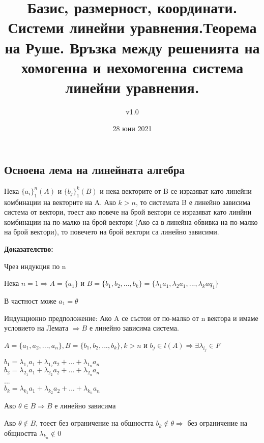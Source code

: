 \documentclass[fleqn,12pt]{article}
\title{Базис, размерност, координати.  Системи линейни уравнения.Теорема на Руше. Връзка между решенията на хомогенна и нехомогенна система линейни уравнения.}
\author{v1.0}
\date{28 юни 2021}
\begin{document}
\maketitle

\tableofcontents

\begin{flushleft}

\section{Осноена лема на линейната алгебра}
Нека $ \{ a_i \}_1^n (A) $ и $ \{ b_j \}_1^k (B) $ и нека векторите от B се изразяват като линейни комбинации на векторите на A. Ако $ k > n $, то системата B е линейно зависима система от вектори, тоест ако повече на брой вектори се изразяват като линйни комбинации на по-малко на брой вектори (Ако са в линейна обвивка на по-малко на брой вектори), то повечето на брой вектори са линейно зависими.

\vspace{5mm}

\textbf{Доказателство:}

Чрез индукция по n

\vspace{5mm}

Нека $ n = 1 \Rightarrow A = \{a_1\} $ и $ B = \{b_1, b_2, ..., b_k \} = \{\lambda_1 a_1, \lambda_2 a_1, ..., \lambda_k aq_1 \} $

В частност може $ a_1 = \theta $

\vspace{5mm}

Индукционно предположение:  Ако A се състои от по-малко от n вектора и имаме условието на Лемата $ \Rightarrow B $ е линейно зависима система.

$ A = \{a_1, a_2, ..., a_n\}, B = \{b_1, b_2, ..., b_k\}, k > n $ и $ b_j \in l(A) \Rightarrow \exists \lambda_{i_j} \in F $

$ b_1 = \lambda_{1_1} a_1 + \lambda_{1_2} a_2 + ... + \lambda_{1_n} a_n $\\
$ b_2 = \lambda_{2_1} a_1 + \lambda_{2_2} a_2 + ... + \lambda_{2_n} a_n $\\
...\\
$ b_k = \lambda_{k_1} a_1 + \lambda_{k_2} a_2 + ... + \lambda_{k_n} a_n $

Ако $ \theta \in B \Rightarrow B $ е линейно зависима

Ако $ \theta \notin B $, тоест без ограничение на общността $ b_k \notin \theta \Rightarrow $ без ограничение на общността $\lambda_{k_n} \notin 0 $


\end{flushleft}
\end{document}
